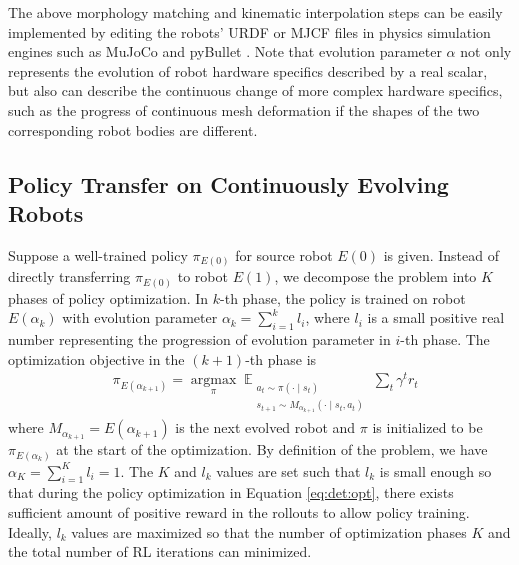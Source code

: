 \documentclass[nohyperref]{article}
\theoremstyle{plain}
\theoremstyle{definition}
\theoremstyle{remark}
\begin{document}
The above morphology matching and kinematic interpolation steps can be easily implemented by editing the robots' URDF or MJCF files in physics simulation engines such as MuJoCo \cite{mujoco:gym} and pyBullet \cite{pybullet}. 
Note that evolution parameter $\alpha$ not only represents the evolution of robot hardware specifics described by a real scalar, but also can describe the continuous change of more complex hardware specifics, such as the progress of continuous mesh deformation if the shapes of the two corresponding robot bodies are different.



\subsection{Policy Transfer on Continuously Evolving Robots}\label{sec:policy:evolve}

Suppose a well-trained policy $\pi_{E(0)}$ for source robot $E(0)$ is given. 
Instead of directly transferring $\pi_{E(0)}$ to robot $E(1)$, we decompose the problem into $K$ phases of policy optimization.
In $k$-th phase, the policy is trained on robot $E(\alpha_k)$ with evolution parameter $\alpha_k = \sum_{i=1}^k l_i$, where $l_i$ is a small positive real number representing the progression of evolution parameter in $i$-th phase.
The optimization objective in the $(k+1)$-th phase is
\begin{equation} \label{eq:det:opt}
\begin{split}
    & \pi_{E(\alpha_{k+1})} = 
    \mathop{\arg \max}\limits_{\pi}
    \mathop{\mathbb{E}}_{ 
    \substack{a_t \sim \pi(\cdot \mid s_t)\\ s_{t+1} \sim M_{\alpha_{k+1}}(\cdot \mid s_t, a_t)}}
    \sum_{t} \gamma^t r_t 
\end{split}
\end{equation}
where $M_{\alpha_{k+1}} = E(\alpha_{k+1})$ is the next evolved robot and $\pi$ is initialized to be $\pi_{E(\alpha_{k})}$ at the start of the optimization.
By definition of the problem, we have $\alpha_K = \sum_{i=1}^K l_i=1$.
The $K$ and $l_k$ values are set such that $l_k$ is small enough so that during the policy optimization in Equation \eqref{eq:det:opt}, there exists sufficient amount of positive reward in the rollouts to allow policy training.
Ideally, $l_k$ values are maximized so that the number of optimization phases $K$ and the total number of RL iterations can minimized.
\end{document}
